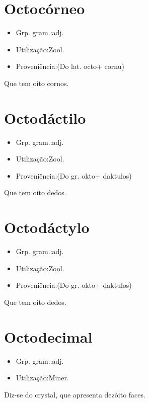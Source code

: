 \section{Octocórneo}
\begin{itemize}
\item {Grp. gram.:adj.}
\end{itemize}
\begin{itemize}
\item {Utilização:Zool.}
\end{itemize}
\begin{itemize}
\item {Proveniência:(Do lat. \textunderscore octo\textunderscore  + \textunderscore cornu\textunderscore )}
\end{itemize}
Que tem oito cornos.
\section{Octodáctilo}
\begin{itemize}
\item {Grp. gram.:adj.}
\end{itemize}
\begin{itemize}
\item {Utilização:Zool.}
\end{itemize}
\begin{itemize}
\item {Proveniência:(Do gr. \textunderscore okto\textunderscore  + \textunderscore daktulos\textunderscore )}
\end{itemize}
Que tem oito dedos.
\section{Octodáctylo}
\begin{itemize}
\item {Grp. gram.:adj.}
\end{itemize}
\begin{itemize}
\item {Utilização:Zool.}
\end{itemize}
\begin{itemize}
\item {Proveniência:(Do gr. \textunderscore okto\textunderscore  + \textunderscore daktulos\textunderscore )}
\end{itemize}
Que tem oito dedos.
\section{Octodecimal}
\begin{itemize}
\item {Grp. gram.:adj.}
\end{itemize}
\begin{itemize}
\item {Utilização:Miner.}
\end{itemize}
Diz-se do crystal, que apresenta dezóito faces.
